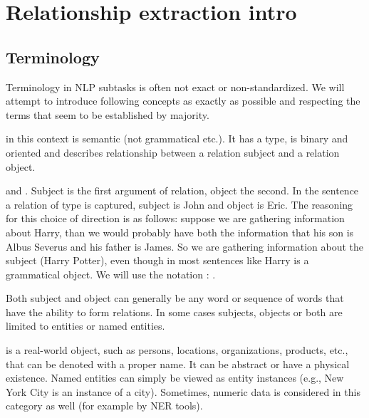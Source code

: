 \chapter{Relationship extraction intro} 

\section{Terminology}
Terminology in NLP subtasks is often not exact or non-standardized. We will attempt to introduce following concepts as exactly as possible and respecting the terms that seem to be established by majority.  


 in this context is semantic (not grammatical etc.). It has a type, is binary and oriented and describes relationship between a relation subject and a relation object.

 and . Subject is the first argument of relation, object the second. In the sentence  a relation of type is captured, subject is John and object is Eric. The reasoning for this choice of direction is as follows: suppose we are gathering information about Harry, than we would probably have both the information that his son is Albus Severus and his father is James. So we are gathering information about the subject (Harry Potter), even though in most sentences like   Harry is a grammatical object. We will use the notation : . 

Both subject and object can generally be any word or sequence of words that have the ability to form relations. In some cases subjects, objects or both are limited to entities or named entities. 

   is a real-world object, such as persons, locations, organizations, products, etc., that can be denoted with a proper name. It can be abstract or have a physical existence. Named entities can simply be viewed as entity instances (e.g., New York City is an instance of a city). Sometimes, numeric data is considered in this category as well (for example by NER tools).  

